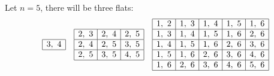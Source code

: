 \documentclass[11pt]{article}
\newcommand{\sourcepage}[1]{\marginpar{\scriptsize p.~#1}}
\begin{document}
\sourcepage{90}
Let $n=5$, there will be three flats:
\[
\begin{array}{ccc}
\begin{array}{|c|}\hline 3,\ 4\\ \hline\end{array}
&
\begin{array}{|c|c|c|}\hline
2,\ 3&2,\ 4&2,\ 5\\ \hline
2,\ 4&2,\ 5&3,\ 5\\ \hline
2,\ 5&3,\ 5&4,\ 5\\ \hline
\end{array}
&
\begin{array}{|c|c|c|c|c|}\hline
1,\ 2&1,\ 3&1,\ 4&1,\ 5&1,\ 6\\ \hline
1,\ 3&1,\ 4&1,\ 5&1,\ 6&2,\ 6\\ \hline
1,\ 4&1,\ 5&1,\ 6&2,\ 6&3,\ 6\\ \hline
1,\ 5&1,\ 6&2,\ 6&3,\ 6&4,\ 6\\ \hline
1,\ 6&2,\ 6&3,\ 6&4,\ 6&5,\ 6\\ \hline
\end{array}
\end{array}
\]
\end{document}
